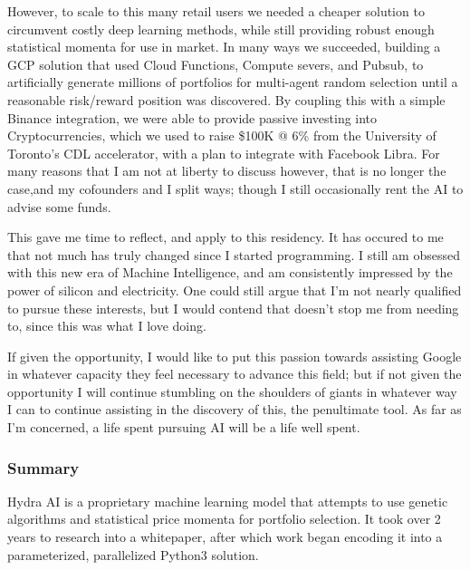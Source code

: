 \documentclass[11pt, a4paper]{awesome-cv}
\begin{document}
\begin{cvletter}
However, to scale to this many retail users we needed a cheaper solution to
circumvent costly deep learning methods, while still providing robust enough
statistical momenta for use in market. In many ways we succeeded, building a
GCP solution that used Cloud Functions, Compute severs,  and Pubsub, to
artificially generate millions of portfolios for multi-agent random selection
until a reasonable risk/reward position was discovered. By coupling this with a simple Binance integration, we were able to provide passive investing into Cryptocurrencies, which we used to raise \$100K @ 6\% from the University of Toronto's CDL accelerator, with a plan to integrate with Facebook Libra. For many reasons that I am not at liberty to discuss however,  that is no longer
the case,and my cofounders and I split ways; though I still occasionally rent the AI to advise some funds.

This gave me time to reflect, and apply to this residency. It has occured to
me that not much has truly changed since I started programming. I still am
obsessed with this new era of Machine Intelligence, and am consistently
impressed by the power of silicon and electricity. One could still argue that
I'm not nearly qualified to pursue these interests, but I would contend that
doesn't stop me from needing to, since this was what I love doing.

If given the opportunity, I would like to put this passion towards assisting
Google in whatever capacity they feel necessary to advance this field; but if not given the opportunity I will
continue stumbling on the shoulders of giants in whatever way I can to continue assisting in the
discovery of this, the penultimate tool. As far as I'm concerned, a life spent
pursuing AI will be a life well spent.

\pagebreak
{}

\subsubsection{Summary}

Hydra AI is a proprietary machine learning model that attempts to use genetic
algorithms and statistical price momenta for portfolio selection. It took over 2
years to research into a whitepaper, after which work began encoding it into a
parameterized, parallelized Python3 solution.


\end{cvletter}
\end{document}
